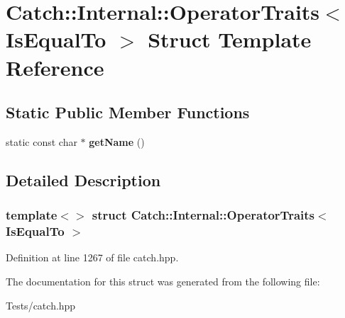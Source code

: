 \hypertarget{struct_catch_1_1_internal_1_1_operator_traits_3_01_is_equal_to_01_4}{}\section{Catch\+:\+:Internal\+:\+:Operator\+Traits$<$ Is\+Equal\+To $>$ Struct Template Reference}
\label{struct_catch_1_1_internal_1_1_operator_traits_3_01_is_equal_to_01_4}
\subsection*{Static Public Member Functions}
\begin{DoxyCompactItemize}
\item 
\mbox{\label{struct_catch_1_1_internal_1_1_operator_traits_3_01_is_equal_to_01_4_addf03ac66f0ed83abcc037a7a327d4f1}} 
static const char $\ast$ {\bfseries get\+Name} ()
\end{DoxyCompactItemize}


\subsection{Detailed Description}
\subsubsection*{template$<$$>$\newline
struct Catch\+::\+Internal\+::\+Operator\+Traits$<$ Is\+Equal\+To $>$}



Definition at line 1267 of file catch.\+hpp.



The documentation for this struct was generated from the following file\+:\begin{DoxyCompactItemize}
\item 
Tests/catch.\+hpp\end{DoxyCompactItemize}
